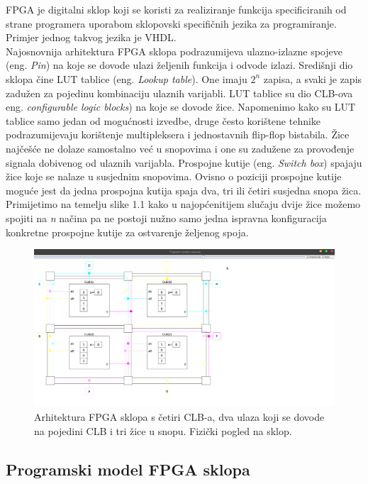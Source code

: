\documentclass[times, utf8, zavrsni]{fer}
\begin{document}
	FPGA je digitalni sklop koji se koristi za realiziranje funkcija specificiranih od strane programera uporabom sklopovski specifičnih jezika za programiranje. Primjer jednog takvog jezika je VHDL.\\ Najosnovnija arhitektura FPGA sklopa podrazumijeva ulazno-izlazne spojeve (eng. \emph{Pin}) na koje se dovode ulazi željenih funkcija i odvode izlazi. Središnji dio sklopa čine LUT tablice (eng. \emph{Lookup table}). One imaju $2^n$ zapisa, a svaki je zapis zadužen za pojedinu kombinaciju ulaznih varijabli. LUT tablice su dio CLB-ova eng. \emph{configurable logic blocks}) na koje se dovode žice. Napomenimo kako su LUT tablice samo jedan od mogućnosti izvedbe, druge često korištene tehnike podrazumijevaju korištenje multipleksera i jednostavnih flip-flop bistabila. Žice najčešće ne dolaze samostalno već u snopovima i one su zadužene za provođenje signala dobivenog od ulaznih varijabla. Prospojne kutije (eng. \emph{Switch box}) spajaju žice koje se nalaze u susjednim snopovima. Ovisno o poziciji prospojne kutije moguće jest da jedna prospojna kutija spaja dva, tri ili četiri susjedna snopa žica.\\ Primijetimo na temelju slike 1.1 kako u najopćenitijem slučaju dvije žice možemo spojiti na \emph{n} načina pa ne postoji nužno samo jedna ispravna konfiguracija konkretne prospojne kutije za ostvarenje željenog spoja.
	
	\begin{figure}[H]
		\centering
		\includegraphics[width=20cm]{slike/arhFPGA.png}
		\caption{Arhitektura FPGA sklopa s četiri CLB-a, dva ulaza koji se dovode na pojedini CLB i tri žice u snopu. Fizički pogled na sklop.}
		\label{fig:arh-fpga}
	\end{figure}
	
	\subsection{Programski model FPGA sklopa}
	
\end{document}
